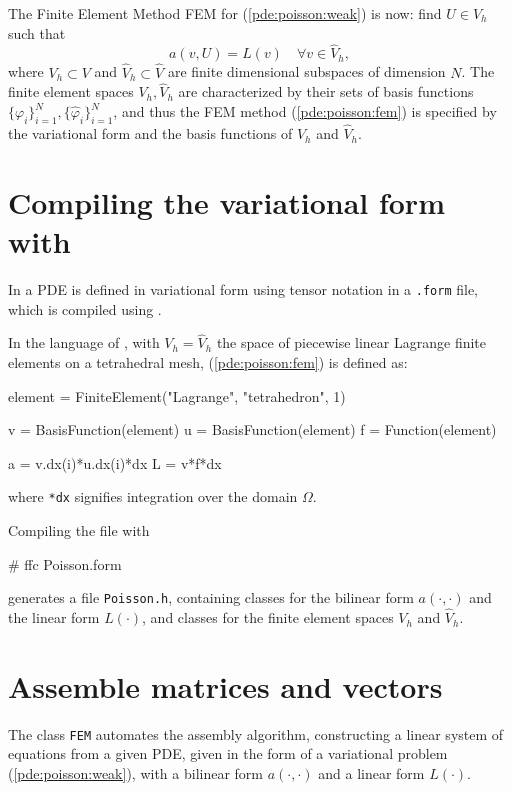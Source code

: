 The Finite Element Method FEM for (\ref{pde:poisson:weak}) is now: 
find $U\in V_h$ such that  
\begin{equation}\label{pde:poisson:fem}
a(v,U)=L(v) \quad \forall v\in \hat V_h, 
\end{equation}
where $V_h\subset V$ and $\hat V_h\subset \hat V$ are finite dimensional 
subspaces of dimension $N$. 
The finite element spaces $V_h,\hat V_h$ are characterized by their sets of basis 
functions $\{\varphi_i\}_{i=1}^N,\{\hat \varphi_i\}_{i=1}^N$, 
and thus the FEM method (\ref{pde:poisson:fem}) is specified by the 
variational form and the basis functions of $V_h$ and $\hat V_h$. 

\section{Compiling the variational form with \ffc{}}

In \dolfin{} a PDE is defined in variational form using tensor notation 
in a \texttt{.form} file, which is compiled using \ffc{}. 

In the language of \ffc{}, with $V_h=\hat V_h$ the space of piecewise linear Lagrange 
finite elements on a tetrahedral mesh, (\ref{pde:poisson:fem}) is defined as:  
\begin{code}
element = FiniteElement("Lagrange", "tetrahedron", 1)

v = BasisFunction(element)
u = BasisFunction(element)
f = Function(element)

a = v.dx(i)*u.dx(i)*dx
L = v*f*dx
\end{code}
where \texttt{*dx} signifies integration over the domain $\Omega$. 

Compiling the file with 
\begin{code}
# ffc Poisson.form
\end{code}
generates a file \texttt{Poisson.h}, containing classes for 
the bilinear form $a(\cdot,\cdot)$ and the linear form $L(\cdot)$, 
and classes for the finite element spaces $V_h$ and $\hat V_h$. 

\section{Assemble matrices and vectors}

The class \texttt{FEM} automates the assembly algorithm, constructing a linear 
system of equations from a given PDE, 
given in the form of a variational problem (\ref{pde:poisson:weak}), 
with a bilinear form $a(\cdot,\cdot)$ and a linear form $L(\cdot)$. 

